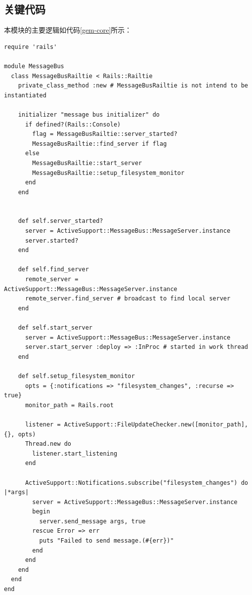 \subsection{关键代码}
本模块的主要逻辑如代码\ref{gem-core}所示：
\begin{lstlisting}[caption={初始化核心代码展示}, label=gem-core]
require 'rails'

module MessageBus
  class MessageBusRailtie < Rails::Railtie
    private_class_method :new # MessageBusRailtie is not intend to be instantiated

    initializer "message bus initializer" do
      if defined?(Rails::Console)
        flag = MessageBusRailtie::server_started?
        MessageBusRailtie::find_server if flag
      else
        MessageBusRailtie::start_server
        MessageBusRailtie::setup_filesystem_monitor
      end
    end


    def self.server_started?
      server = ActiveSupport::MessageBus::MessageServer.instance
      server.started?
    end

    def self.find_server
      remote_server = ActiveSupport::MessageBus::MessageServer.instance
      remote_server.find_server # broadcast to find local server
    end

    def self.start_server
      server = ActiveSupport::MessageBus::MessageServer.instance
      server.start_server :deploy => :InProc # started in work thread
    end

    def self.setup_filesystem_monitor
      opts = {:notifications => "filesystem_changes", :recurse => true}
      monitor_path = Rails.root

      listener = ActiveSupport::FileUpdateChecker.new([monitor_path], {}, opts)
      Thread.new do
        listener.start_listening
      end

      ActiveSupport::Notifications.subscribe("filesystem_changes") do |*args|
        server = ActiveSupport::MessageBus::MessageServer.instance
        begin
          server.send_message args, true
        rescue Error => err
          puts "Failed to send message.(#{err})"
        end
      end
    end
  end
end
\end{lstlisting}








